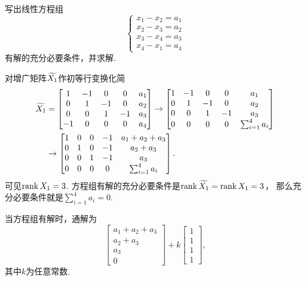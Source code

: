 \begin{example}
写出线性方程组\[
	\left\{ \begin{array}{l}
		x_1 - x_2 = a_1 \\
		x_2 - x_3 = a_2 \\
		x_3 - x_4 = a_3 \\
		x_4 - x_1 = a_4
	\end{array} \right.
\]有解的充分必要条件，并求解.
\begin{solution}
对增广矩阵\(\widetilde{X_1}\)作初等行变换化简
\begin{align*}
	\widetilde{X_1}
	&= \begin{bmatrix}
		1 & -1 & 0 & 0 & a_1 \\
		0 & 1 & -1 & 0 & a_2 \\
		0 & 0 & 1 & -1 & a_3 \\
		-1 & 0 & 0 & 0 & a_4
	\end{bmatrix} \to \begin{bmatrix}
		1 & -1 & 0 & 0 & a_1 \\
		0 & 1 & -1 & 0 & a_2 \\
		0 & 0 & 1 & -1 & a_3 \\
		0 & 0 & 0 & 0 & \sum_{i=1}^4 a_i
	\end{bmatrix} \\
	&\to \begin{bmatrix}
		1 & 0 & 0 & -1 & a_1 + a_2 + a_3 \\
		0 & 1 & 0 & -1 & a_2 + a_3 \\
		0 & 0 & 1 & -1 & a_3 \\
		0 & 0 & 0 & 0 & \sum_{i=1}^4 a_i
	\end{bmatrix}.
\end{align*}
可见\(\rank X_1 = 3\).
方程组有解的充分必要条件是\(\rank\widetilde{X_1} = \rank X_1 = 3\)，
那么充分必要条件就是\(\sum_{i=1}^4 a_i = 0\).

当方程组有解时，通解为\[
	\begin{bmatrix}
		a_1 + a_2 + a_3 \\ a_2 + a_3 \\ a_3 \\ 0
	\end{bmatrix}
	+ k \begin{bmatrix}
		1 \\ 1 \\ 1 \\ 1
	\end{bmatrix},
\]
其中\(k\)为任意常数.
\end{solution}
\end{example}

